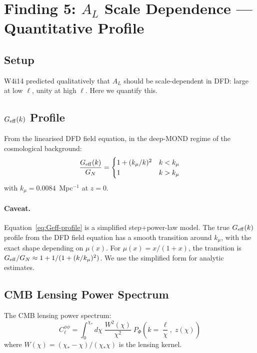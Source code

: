 \documentclass[11pt,a4paper]{article}
\newcommand{\Geff}{G_{\rm eff}}
\begin{document}
\section{Finding 5: $A_L$ Scale Dependence --- Quantitative Profile}
\label{sec:AL-quantitative}

\subsection{Setup}

W4i14 predicted qualitatively that $A_L$ should be scale-dependent in
DFD: large at low $\ell$, unity at high $\ell$.  Here we quantify this.

\subsection{$\Geff(k)$ Profile}

From the linearised DFD field equation, in the deep-MOND regime of the
cosmological background:
\begin{equation}
\frac{\Geff(k)}{G_N} = \begin{cases}
1 + (k_\mu/k)^2 & k < k_\mu \\
1 & k > k_\mu
\end{cases}
\label{eq:Geff-profile}
\end{equation}
with $k_\mu = 0.0084$~Mpc$^{-1}$ at $z = 0$.

\paragraph{Caveat.}
Equation~\eqref{eq:Geff-profile} is a simplified step+power-law model.
The true $\Geff(k)$ profile from the DFD field equation has a smooth
transition around $k_\mu$, with the exact shape depending on $\mu(x)$.
For $\mu(x) = x/(1+x)$, the transition is $\Geff/G_N \approx 1 + 1/(1 + (k/k_\mu)^2)$.
We use the simplified form for analytic estimates.

\subsection{CMB Lensing Power Spectrum}

The CMB lensing power spectrum:
\begin{equation}
C_\ell^{\phi\phi} = \int_0^{\chi_*} d\chi\;
\frac{W^2(\chi)}{\chi^2}\;
P_\Phi\!\left(k = \frac{\ell}{\chi},\; z(\chi)\right)
\end{equation}
where $W(\chi) = (\chi_* - \chi)/(\chi_* \chi)$ is the lensing kernel.
\end{document}
